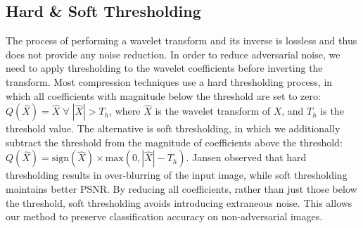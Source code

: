 \subsection{Hard \& Soft Thresholding}


The process of performing a wavelet transform and its inverse is lossless and thus does not provide any noise reduction.
In order to reduce adversarial noise, we need to apply thresholding to the wavelet coefficients before inverting the transform.
Most compression techniques use a hard thresholding process, in which all coefficients with magnitude below the threshold are set to zero: $Q(\hat{X}) = \hat{X} \; \forall \; |\hat{X}| > T_h$, where $\hat{X}$ is the wavelet transform of $X$, and $T_h$ is the threshold value.
The alternative is soft thresholding, in which we additionally subtract the threshold from the magnitude of coefficients above the threshold: $Q(\hat{X}) = \text{sign}(\hat{X})\times \text{max}(0,|\hat{X}| - T_h)$.
Jansen \etal \cite{ThresholdingJansen2012noise} observed that hard thresholding results in over-blurring of the input image, while soft thresholding maintains better PSNR.
By reducing all coefficients, rather than just those below the threshold, soft thresholding avoids introducing extraneous noise.
This allows our method to preserve classification accuracy on non-adversarial images.


